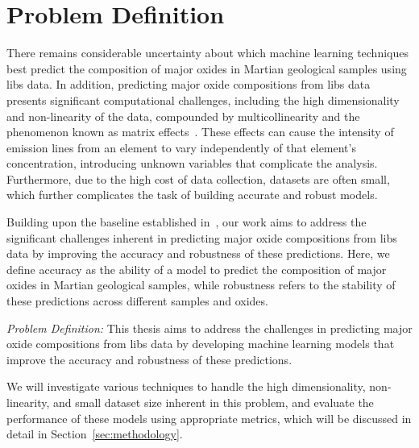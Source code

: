 \section{Problem Definition}\label{sec:problem_definition}
There remains considerable uncertainty about which machine learning techniques best predict the composition of major oxides in Martian geological samples using \gls{libs} data.
In addition, predicting major oxide compositions from \gls{libs} data presents significant computational challenges, including the high dimensionality and non-linearity of the data, compounded by multicollinearity and the phenomenon known as matrix effects~\cite{andersonImprovedAccuracyQuantitative2017}.
These effects can cause the intensity of emission lines from an element to vary independently of that element's concentration, introducing unknown variables that complicate the analysis.
Furthermore, due to the high cost of data collection, datasets are often small, which further complicates the task of building accurate and robust models.

Building upon the baseline established in~\citet{p9_paper}, our work aims to address the significant challenges inherent in predicting major oxide compositions from \gls{libs} data by improving the accuracy and robustness of these predictions.
Here, we define accuracy as the ability of a model to predict the composition of major oxides in Martian geological samples, while robustness refers to the stability of these predictions across different samples and oxides.

\textit{Problem Definition:} This thesis aims to address the challenges in predicting major oxide compositions from \gls{libs} data by developing machine learning models that improve the accuracy and robustness of these predictions. 

We will investigate various techniques to handle the high dimensionality, non-linearity, and small dataset size inherent in this problem, and evaluate the performance of these models using appropriate metrics, which will be discussed in detail in Section~\ref{sec:methodology}.

